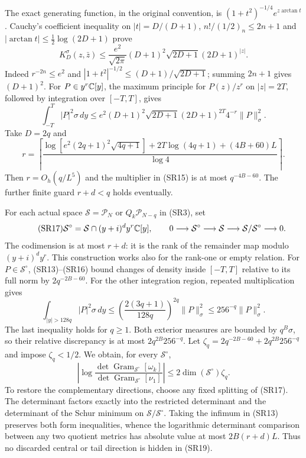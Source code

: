 \documentclass[11pt]{article}
\newcommand{\PP}{\mathcal P}\newcommand{\BB}{\mathcal B}
\newcommand{\dd}{\,d}\newcommand{\Tr}{\operatorname{Tr}}
\newcommand{\Gram}{\operatorname{Gram}}\newcommand{\rank}{\operatorname{rank}}
\begin{document}
The exact generating function, in the original convention, is
$(1+t^2)^{-1/4}e^{z\arctan t}$ \cite{DLMF}. Cauchy's coefficient inequality
on $|t|=D/(D+1)$, $n!/(1/2)_n\le2n+1$ and
$|\arctan t|\le\frac12\log(2D+1)$ prove
\begin{equation}\tag{SR14}
 K_D^\sigma(z,\bar z)
 \le\frac{e^2}{\sqrt{2\pi}}(D+1)^2\sqrt{2D+1}(2D+1)^{|z|}.
\end{equation}
Indeed $r^{-2n}\le e^2$ and
$|1+t^2|^{-1/2}\le(D+1)/\sqrt{2D+1}$; summing $2n+1$ gives
$(D+1)^2$. For $P\in y^r\mathbb C[y]$, the maximum principle for $P(z)/z^r$
on $|z|=2T$, followed by integration over $[-T,T]$, gives
\begin{equation}\tag{SR15}
 \int_{-T}^T|P|^2\sigma\dd y
 \le e^2(D+1)^2\sqrt{2D+1}(2D+1)^{2T}4^{-r}\|P\|_\sigma^2.
\end{equation}
Take $D=2q$ and
\begin{equation}\tag{SR16}
 r=\left\lceil\frac{
 \log[e^2(2q+1)^2\sqrt{4q+1}]+2T\log(4q+1)+(4B+60)L}
 {\log4}\right\rceil.
\end{equation}
Then $r=O_h(q/L^5)$ and the multiplier in (SR15) is at most $q^{-4B-60}$.
The further finite guard $r+d<q$ holds eventually.

For each actual space $\mathcal S=\PP_N$ or $Q_k\PP_{N-q}$ in (SR3), set
\begin{equation}\tag{SR17}
 \mathcal S^\circ=\mathcal S\cap(y+i)^d y^r\mathbb C[y],\qquad
 0\longrightarrow\mathcal S^\circ\longrightarrow\mathcal S
 \longrightarrow\mathcal S/\mathcal S^\circ\longrightarrow0.
\end{equation}
The codimension is at most $r+d$: it is the rank of the remainder map modulo
$(y+i)^dy^r$. This construction works also for the rank-one or empty relation.
For $P\in\mathcal S^\circ$, (SR13)--(SR16) bound changes of density inside
$[-T,T]$ relative to its full norm by $2q^{-2B-60}$.
For the other integration region, repeated multiplication gives
\begin{equation}\tag{SR18}
 \int_{|y|>128q}|P|^2\sigma\dd y
 \le\left(\frac{2(3q+1)}{128q}\right)^{2q}\|P\|_\sigma^2
 \le256^{-q}\|P\|_\sigma^2.
\end{equation}
The last inequality holds for $q\ge1$. Both exterior measures are bounded
by $q^B\sigma$, so their relative discrepancy is at most $2q^{2B}256^{-q}$.
Let $\zeta_q=2q^{-2B-60}+2q^{2B}256^{-q}$ and impose $\zeta_q<1/2$.
We obtain, for every $\mathcal S^\circ$,
\begin{equation}\tag{SR19}
 \left|\log\frac{\det\Gram_{\mathcal S^\circ}[\omega_k]}
 {\det\Gram_{\mathcal S^\circ}[\nu_1]}\right|
 \le2\dim(\mathcal S^\circ)\zeta_q.
\end{equation}
To restore the complementary directions, choose any fixed splitting of
(SR17). The determinant factors exactly into the restricted determinant and
the determinant of the Schur minimum on $\mathcal S/\mathcal S^\circ$.
Taking the infimum in (SR13) preserves both form inequalities, whence the
logarithmic determinant comparison between any two quotient metrics has
absolute value at most $2B(r+d)L$. Thus no discarded central or tail direction
is hidden in (SR19).
\end{document}
